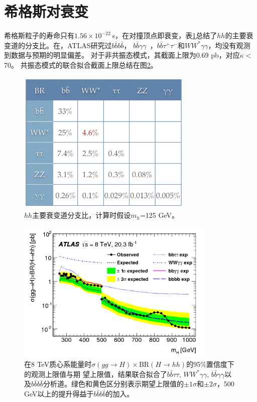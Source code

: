 \section{希格斯对衰变}
希格斯粒子的寿命只有$1.56\times10^{-22}~$s，在对撞顶点即衰变，表\ref{fig:HH_br}总结了$hh$的主要衰变道的分支比。在\RunOne ，ATLAS研究过$b\bar{b}b\bar{b}$\cite{Aad:2015uka}，
$b\bar{b}\gamma\gamma$~\cite{Aad:2014yja}，$b\bar{b}\tau^{+}\tau^{-}$和$WW^{*}\gamma\gamma$，均没有观测到数据与预期的明显偏差。
对于非共振态模式，其截面上限为0.69 pb，对应$\kappa<$70。
共振态模式的联合拟合截面上限总结在图\ref{fig:HH_run1_combined}。
\begin{figure}[h]
\centering
 \includegraphics[width=0.75\textwidth]{fig/HH_br.png}
  \caption{$hh$主要衰变道分支比，计算时假设$m_h$=125 GeV。}
  \label{fig:HH_br}
\end{figure}

\begin{figure}[h]
\centering
 \includegraphics[width=0.85\textwidth]{fig/HH_run1_combined.png}
\caption{在8 TeV质心系能量时$\sigma(gg\rightarrow H)\times\text{BR}(H\rightarrow hh)$的95\%置信度下的观测上限值与期
望上限值，结果联合拟合了$b\bar{b}\tau\tau$, $WW^*\gamma\gamma$, $b\bar{b}\gamma\gamma$以及$b\bar{b}b\bar{b}$分析道。绿色和黄色区分别表示期望上限值的$\pm 1\sigma$和$\pm 2\sigma$，500 GeV以上的提升得益于$b\bar{b}b\bar{b}$的加入。}
\label{fig:HH_run1_combined}
\end{figure}

